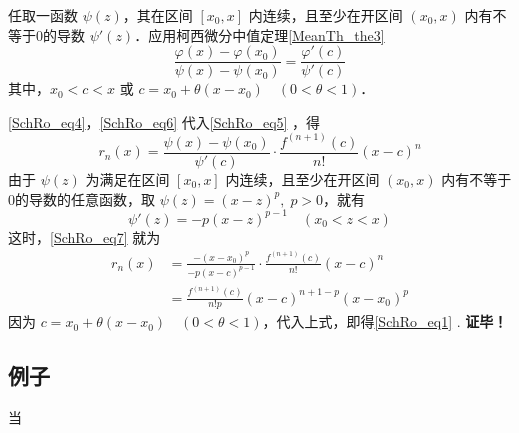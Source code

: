 任取一函数 $\psi(z)$，其在区间 $[x_0,x]$ 内连续，且至少在开区间 $(x_0,x)$ 内有不等于0的导数 $\psi'(z)$．应用柯西微分中值定理\autoref{MeanTh_the3}~
\begin{equation}\label{SchRo_eq5}
\frac{\varphi(x)-\varphi(x_0)}{\psi(x)-\psi(x_0)}=\frac{\varphi'(c)}{\psi'(c)}
\end{equation}
其中，$x_0<c<x$ 或 $c=x_0+\theta(x-x_0)\quad(0<\theta<1)$．

\autoref{SchRo_eq4}，\autoref{SchRo_eq6}  代入\autoref{SchRo_eq5} ，得
\begin{equation}\label{SchRo_eq7}
r_n(x)=\frac{\psi(x)-\psi(x_0)}{\psi'(c)}\cdot\frac{f^{(n+1)}(c)}{n!}(x-c)^n
\end{equation}
由于 $\psi(z)$ 为满足在区间 $[x_0,x]$ 内连续，且至少在开区间 $(x_0,x)$ 内有不等于0的导数的任意函数，取 $\psi(z)=(x-z)^p,\;p>0$，就有
\begin{equation}
\psi'(z)=-p(x-z)^{p-1}\quad (x_0<z<x)
\end{equation}
这时，\autoref{SchRo_eq7} 就为
\begin{equation}
\begin{aligned}
r_n(x)&=\frac{-(x-x_0)^p}{-p(x-c)^{p-1}}\cdot\frac{f^{(n+1)}(c)}{n!}(x-c)^n\\
&=\frac{f^{(n+1)}(c)}{n!p}(x-c)^{n+1-p}(x-x_0)^p
\end{aligned}
\end{equation}
因为 $c=x_0+\theta(x-x_0)\quad(0<\theta<1)$，代入上式，即得\autoref{SchRo_eq1} .
\textbf{证毕！}

\subsection{例子}
当